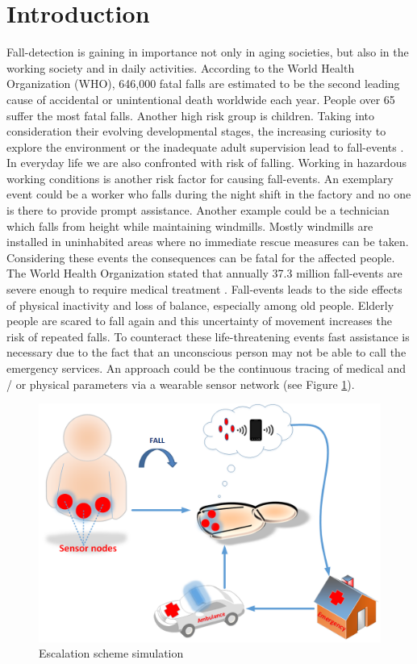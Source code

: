 \documentclass[review]{elsarticle}
\begin{document}

\section{Introduction}
Fall-detection is gaining in importance not only in aging societies, but also in the working society and in daily activities. According to the World Health Organization (WHO), 646,000 fatal falls are estimated to be the second leading cause of accidental or unintentional death worldwide each year. People over 65 suffer the most fatal falls. Another high risk group is children. Taking into consideration their evolving developmental stages, the increasing curiosity to explore the environment or the inadequate adult supervision lead to fall-events \cite{WHO2018}.
In everyday life we are also confronted with risk of falling. Working in hazardous working conditions is another risk factor for causing fall-events. An exemplary event could be a worker who falls during the night shift in the factory and no one is there to provide prompt assistance. Another example could be a technician which falls from height while maintaining windmills. Mostly windmills are installed in uninhabited areas where no immediate rescue measures can be taken. Considering these events the consequences can be fatal for the affected people. 
The World Health Organization stated that annually 37.3 million fall-events are severe enough to require medical treatment \cite{WHO2018}. Fall-events leads to the side effects of physical inactivity and loss of balance, especially among old people. Elderly people are scared to fall again and this uncertainty of movement increases the risk of repeated falls. 
To counteract these life-threatening events fast assistance is necessary due to the fact that an unconscious person may not be able to call the emergency services. An approach could be the continuous tracing of medical and / or physical parameters via a wearable sensor network (see Figure \ref{fig:escalationscheme}).
\begin{figure}[!ht]
	\centering
	\includegraphics[scale=0.38]{Images/EscalationScheme}
	\caption[Escalation scheme]{Escalation scheme simulation~\cite{LaBlunda.2016,LaBlunda.2016b}}
	\label{fig:escalationscheme}
\end{figure}
\end{document}
